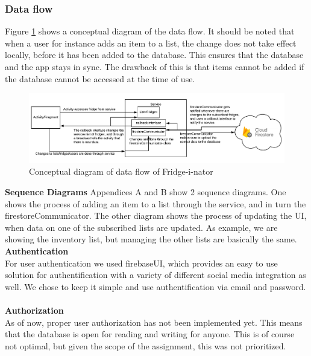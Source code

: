 \documentclass[12pt]{article}
\begin{document}
\subsubsection{Data flow}
Figure \ref{fig:dataflow_diagram} shows a conceptual diagram of the data flow. It should be noted that when a user for instance adds an item to a list, the change does not take effect locally, before it has been added to the database. This ensures that the database and the app stays in sync. The drawback of this is that items cannot be added if the database cannot be accessed at the time of use.
\begin{figure}[H]
	\centering
	\includegraphics[width=180mm]{Img/SMAP_DAL}
	\caption{Conceptual diagram of data flow of Fridge-i-nator}
	\label{fig:dataflow_diagram}
\end{figure}

\textbf{Sequence Diagrams}
Appendices A and B show 2 sequence diagrams. One shows the process of adding an item to a list through the service, and in turn the firestoreCommunicator.
The other diagram shows the process of updating the UI, when data on one of the subscribed lists are updated.
As example, we are showing the inventory list, but managing the other lists are basically the same.\\


\textbf{Authentication}
\\
For user authentication we used firebaseUI, which provides an easy to use solution for authentification with a variety of different social media integration as well. We chose to keep it simple and use authentification via email and password.
\\
\\
\textbf{Authorization}
\\
As of now, proper user authorization has not been implemented yet. This means that the database is open for reading and writing for anyone. This is of course not optimal, but given the scope of the assignment, this was not prioritized.
\end{document}
